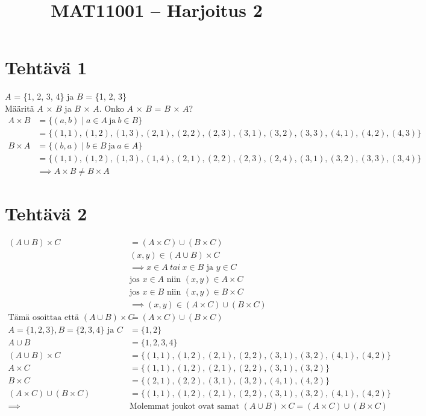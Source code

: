 \documentclass{article}
\begin{document}
	
	\title{MAT11001 – Harjoitus 2}
	\date{}
	\maketitle
	
	
	\section*{Tehtävä 1}
    \(A\) = \{1, 2, 3, 4\} ja \(B\) = \{1, 2, 3\} \\[10pt]
    Määritä \(A\) × \(B\) ja \(B\) × \(A\).
    Onko \(A\) × \(B\) = \(B\) × \(A\)?\\
	\[
        \begin{aligned}
            A \times B &= \{(a,b) \mid a \in A \ \text{ja} \ b \in B\} \\
            &= \{(1,1), (1,2), (1,3), (2,1), (2,2),(2,3),(3,1), (3,2),(3,3), (4,1), (4,2),(4,3)\} \\[10pt]
            B \times A &= \{(b,a) \mid b \in B \ \text{ja} \ a \in A\} \\
            &= \{(1,1), (1,2), (1,3), (1,4), (2,1),(2,2),(2,3), (2,4),(3,1), (3,2), (3,3),(3,4)\}  \\[10pt]
            &\implies A \times B \neq  B \times A
        \end{aligned}
    \] 
    \newpage
	\section*{Tehtävä 2}
    \[
        \begin{aligned}
            (A \cup B) \times C &= (A \times C) \cup (B \times C) \\[10pt]
	        &(x,y) \in (A \cup B) \times C \\
            &\implies x \in A \ tai \ x \in B \text{ ja } y  \in C\\[10pt]
            &\text{jos } x \in A \text{ niin } (x,y) \in A \times C\\
            &\text{jos } x \in B \text{ niin } (x,y) \in B \times C\\[10pt]
            &\implies (x,y) \in (A \times C) \cup (B  \times C)\\[10pt]
            \text{Tämä osoittaa että }(A \cup B) \times C &= (A \times C) \cup (B \times C) \\[10pt]
            A = \{1, 2, 3\}, B = \{2, 3, 4\} \text{ ja } C &= \{1, 2\} \\
            A \cup B &= \{ 1, 2, 3, 4 \} \\
            (A \cup B) \times C &= \{(1,1),(1,2),(2,1),(2,2),(3,1),(3,2),(4,1),(4,2) \} \\[10pt]
            A \times C &= \{(1,1), (1,2),(2,1), (2,2), (3,1),(3,2)\} \\
            B \times C &= \{(2,1), (2,2),(3,1), (3,2), (4,1),(4,2)\} \\
            (A \times C) \cup (B \times C) &= \{(1,1), (1,2),(2,1), (2,2), (3,1),(3,2),(4,1), (4,2) \} \\[10pt]
            \implies &\text{Molemmat joukot ovat samat }(A \cup B) \times C = (A \times C) \cup (B \times C)
        \end{aligned}
    \]
    \newpage
\end{document}
